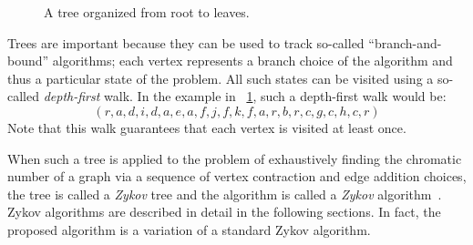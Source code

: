 \begin{figure}[H]
  \centering
  \caption{A tree organized from root to leaves.}
  \label{fig:tree}
\end{figure}

Trees are important because they can be used to track so-called ``branch-and-bound'' algorithms; each vertex
represents a branch choice of the algorithm and thus a particular state of the problem.  All such states can be
visited using a so-called \emph{depth-first} walk.  In the example in \figurename~\ref{fig:tree}, such a
depth-first walk would be:
\[(r,a,d,i,d,a,e,a,f,j,f,k,f,a,r,b,r,c,g,c,h,c,r)\]
Note that this walk guarantees that each vertex is visited at least once.

When such a tree is applied to the problem of exhaustively finding the chromatic number of a graph via a sequence
of vertex contraction and edge addition choices, the tree is called a \emph{Zykov} tree and the algorithm is called
a \emph{Zykov} algorithm~\cite{mcdiarmid}.  Zykov algorithms are described in detail in the following sections.  In
fact, the proposed algorithm is a variation of a standard Zykov algorithm.
